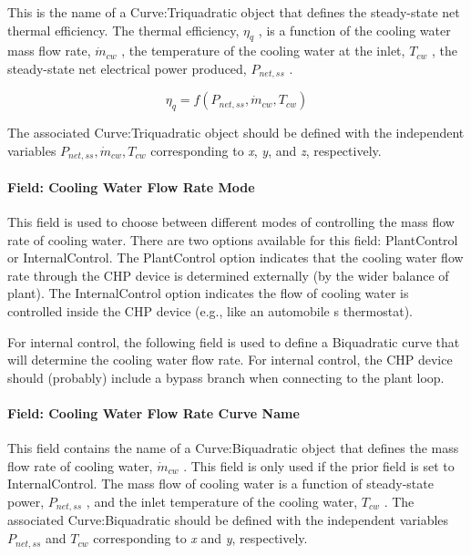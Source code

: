 This is the name of a Curve:Triquadratic object that defines the steady-state net thermal efficiency. The thermal efficiency, \(\eta_q\) , is a function of the cooling water mass flow rate, \(\dot m_{cw}\) , the temperature of the cooling water at the inlet, \(T_{cw}\) , the steady-state net electrical power produced, \(P_{net,ss}\) .

\begin{equation}
{\eta_q} = f\left( {{P_{net,ss}},{{\dot m}_{cw}},{T_{cw}}} \right)
\end{equation}

The associated Curve:Triquadratic object should be defined with the independent variables \({P_{net,ss}},{\dot m_{cw}},{T_{cw}}\) corresponding to \emph{x}, \emph{y}, and \emph{z}, respectively.

\paragraph{Field: Cooling Water Flow Rate Mode}\label{field-cooling-water-flow-rate-mode}

This field is used to choose between different modes of controlling the mass flow rate of cooling water. There are two options available for this field: PlantControl or InternalControl. The PlantControl option indicates that the cooling water flow rate through the CHP device is determined externally (by the wider balance of plant). The InternalControl option indicates the flow of cooling water is controlled inside the CHP device (e.g., like an automobile s thermostat).

For internal control, the following field is used to define a Biquadratic curve that will determine the cooling water flow rate. For internal control, the CHP device should (probably) include a bypass branch when connecting to the plant loop.

\paragraph{Field: Cooling Water Flow Rate Curve Name}\label{field-cooling-water-flow-rate-curve-name}

This field contains the name of a Curve:Biquadratic object that defines the mass flow rate of cooling water, \({\dot m_{cw}}\) . This field is only used if the prior field is set to InternalControl. The mass flow of cooling water is a function of steady-state power, \({P_{net,ss}}\) , and the inlet temperature of the cooling water, \({T_{cw}}\) . The associated Curve:Biquadratic should be defined with the independent variables \({P_{net,ss}}\) and \({T_{cw}}\) corresponding to \emph{x} and \emph{y}, respectively.

